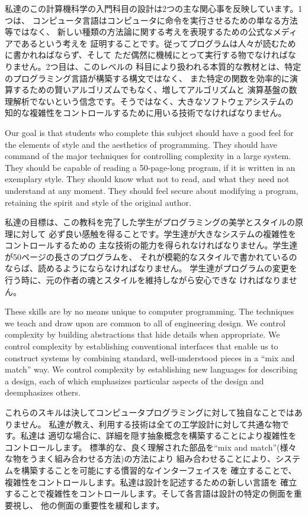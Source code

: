 \documentclass[oneside]{book}
\begin{document}
私達のこの計算機科学の入門科目の設計は2つの主な関心事を反映しています。1つは、
コンピュータ言語はコンピュータに命令を実行させるための単なる方法等ではなく、
新しい種類の方法論に関する考えを表現するための公式なメディアであるという考えを
証明することです。従ってプログラムは人々が読むために書かれねばならず、そして
ただ偶然に機械にとって実行する物でなければなりません。2つ目は、このレベルの
科目により扱われる本質的な教材とは、特定のプログラミング言語が構築する構文ではなく、
また特定の関数を効率的に演算するための賢いアルゴリズムでもなく、増してアルゴリズムと
演算基盤の数理解析でないという信念です。そうではなく、大きなソフトウェアシステムの
知的な複雑性をコントロールするために用いる技術でなければなりません。

Our goal is that students who complete this subject should have a good feel for
the elements of style and the aesthetics of programming.  They should have
command of the major techniques for controlling complexity in a large
system. They should be capable of reading a 50-page-long program, if it is
written in an exemplary style. They should know what not to read, and what they
need not understand at any moment.  They should feel secure about modifying a
program, retaining the spirit and style of the original author.

私達の目標は、この教科を完了した学生がプログラミングの美学とスタイルの原理に対して
必ず良い感触を得ることです。学生達が大きなシステムの複雑性をコントロールするための
主な技術の能力を得られなければなりません。学生達が50ページの長さのプログラムを、
それが模範的なスタイルで書かれているのならば、読めるようにならなければなりません。
学生達がプログラムの変更を行う時に、元の作者の魂とスタイルを維持しながら安心できな
ければなりません。

These skills are by no means unique to computer programming.  The techniques we
teach and draw upon are common to all of engineering design.  We control
complexity by building abstractions that hide details when appropriate.  We
control complexity by establishing conventional interfaces that enable us to
construct systems by combining standard, well-understood pieces in a ``mix and
match'' way.  We control complexity by establishing new languages for
describing a design, each of which emphasizes particular aspects of the design
and deemphasizes others.

これらのスキルは決してコンピュータプログラミングに対して独自なことではありません。
私達が教え、利用する技術は全ての工学設計に対して共通な物です。私達は
適切な場合に、詳細を隠す抽象概念を構築することにより複雑性をコントロールします。
標準的な、良く理解された部品を``mix and match''(様々な物をうまく組み合わせる方法)の方法により
組み合わせることにより、システムを構築することを可能にする慣習的なインターフェイスを
確立することで、複雑性をコントロールします。私達は設計を記述するための新しい言語を
確立することで複雑性をコントロールします。そして各言語は設計の特定の側面を重要視し、
他の側面の重要性を緩和します。
\end{document}
